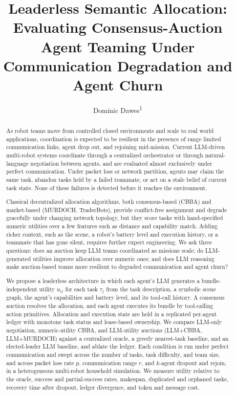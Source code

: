 \documentclass[letterpaper]{article}
\title{Leaderless Semantic Allocation: Evaluating Consensus-Auction Agent Teaming Under Communication Degradation and Agent Churn}
\author{
    Dominic Dawes\textsuperscript{\rm 1}
}
\begin{document}
\maketitle
\begin{abstract}
As robot teams move from controlled closed environments and scale to real world applications, coordination is expected to be resilient in the presence of range limited communication links, agent drop out, and rejoining mid-mission. Current LLM-driven multi-robot systems coordinate through a centralized orchestrator or through natural-language negotiation between agents, and are evaluated almost exclusively under perfect communication. Under packet loss or network partition, agents may claim the same task, abandon tasks held by a failed teammate, or act on a stale belief of current task state. None of these failures is detected before it reaches the environment.

Classical decentralized allocation algorithms, both consensus-based (CBBA) and market-based (MURDOCH, TraderBots), provide conflict-free assignment and degrade gracefully under changing network topology, but they score tasks with hand-specified numeric utilities over a few features such as distance and capability match. Adding richer context, such as the scene, a robot's battery level and execution history, or a teammate that has gone silent, requires further expert engineering. We ask three questions: does an auction keep LLM teams coordinated as missions scale; do LLM-generated utilities improve allocation over numeric ones; and does LLM reasoning make auction-based teams more resilient to degraded communication and agent churn?

We propose a leaderless architecture in which each agent's LLM generates a bundle-independent utility $u_{ij}$ for each task $\tau_j$ from the task description, a symbolic scene graph, the agent's capabilities and battery level, and its tool-call history. A consensus auction resolves the allocation, and each agent executes its bundle by tool-calling action primitives. Allocation and execution state are held in a replicated per-agent ledger with monotone task status and lease-based ownership. We compare LLM-only negotiation, numeric-utility CBBA, and LLM-utility auctions (LLM+CBBA, LLM+MURDOCH) against a centralized oracle, a greedy nearest-task baseline, and an elected-leader LLM baseline, and ablate the ledger. Each condition is run under perfect communication and swept across the number of tasks, task difficulty, and team size, and across packet loss rate $p$, communication range $r$, and $k$-agent dropout and rejoin, in a heterogeneous multi-robot household simulation. We measure utility relative to the oracle, success and partial-success rates, makespan, duplicated and orphaned tasks, recovery time after dropout, ledger divergence, and token and message cost.


\end{abstract}
\end{document}
